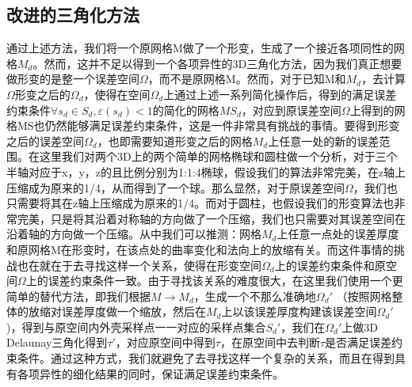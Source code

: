 \subsection{改进的三角化方法}
通过上述方法，我们将一个原网格M做了一个形变，生成了一个接近各项同性的网格$M_d$。然而，这并不足以得到一个各项异性的3D三角化方法，因为我们真正想要做形变的是整一个误差空间$\Omega$，而不是原网格M。然而，对于已知M和$M_d$，去计算$\Omega$形变之后的$\Omega_d$，使得在空间$\Omega_d$上通过上述一系列简化操作后，得到的满足误差约束条件$\forall s_d \in S_d, \varepsilon(s_d)<1$的简化的网格$MS_d$，对应到原误差空间$\Omega$上得到的网格MS也仍然能够满足误差约束条件，这是一件非常具有挑战的事情。要得到形变之后的误差空间$\Omega_d$，也即需要知道形变之后的网格$M_d$上任意一处的新的误差范围。在这里我们对两个3D上的两个简单的网格椭球和圆柱做一个分析，对于三个半轴对应于x，y，z的且比例分别为1:1:4椭球，假设我们的算法非常完美，在z轴上压缩成为原来的1/4，从而得到了一个球。那么显然，对于原误差空间$\Omega$，我们也只需要将其在z轴上压缩成为原来的1/4。而对于圆柱，也假设我们的形变算法也非常完美，只是将其沿着对称轴的方向做了一个压缩，我们也只需要对其误差空间在沿着轴的方向做一个压缩。从中我们可以推测：网格$M_d$上任意一点处的误差厚度和原网格M在形变时，在该点处的曲率变化和法向上的放缩有关。而这件事情的挑战也在就在于去寻找这样一个关系，使得在形变空间$\Omega_d$上的误差约束条件和原空间$\Omega$上的误差约束条件一致。由于寻找该关系的难度很大，在这里我们使用一个更简单的替代方法，即我们根据$M \to M_d$，生成一个不那么准确地$\Omega_d'$ （按照网格整体的放缩对误差厚度做一个缩放，然后在$M_d$上以该误差厚度构建该误差空间$\Omega_d'$)，得到与原空间内外壳采样点一一对应的采样点集合$S_d′$，我们在$\Omega_d'$上做3D Delaunay三角化得到$\tau′$，对应原空间中得到$\tau$，在原空间中去判断$\tau$是否满足误差约束条件。通过这种方式，我们就避免了去寻找这样一个复杂的关系，而且在得到具有各项异性的细化结果的同时，保证满足误差约束条件。

